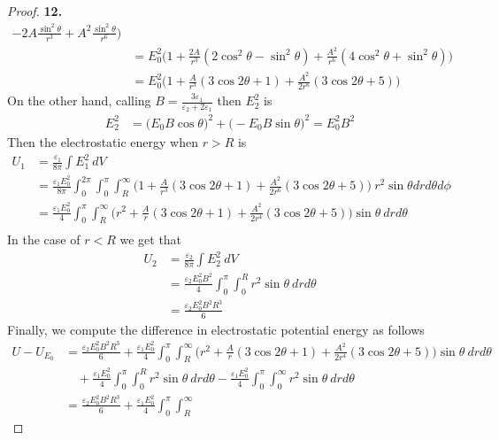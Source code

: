 \documentclass[11pt]{article}
\theoremstyle{definition}
\begin{document}
\begin{proof}{\textbf{12.}}
\begin{align*}
    - 2A\frac{\sin^2\theta}{r^3} + A^2\frac{\sin^2\theta}{r^6}\bigg)\\
    &= E_0^2\bigg(
        1 + \frac{2A}{r^3}(2\cos^2\theta - \sin^2\theta) + \frac{A^2}{r^6}(4\cos^2\theta +\sin^2\theta)
    \bigg)\\
    &= E_0^2\bigg(1 + \frac{A}{r^3}(3\cos2\theta + 1)
    + \frac{A^2}{2r^6}(3\cos2\theta + 5)\bigg)
\end{align*}
On the other hand, calling $B =\frac{3\varepsilon_1}{\varepsilon_2 + 2\varepsilon_1}$
then $E_2^2$ is
\begin{align*}
    E_2^2 &= \bigg(E_0B \cos\theta\bigg)^2 
    + \bigg(- E_0B \sin\theta\bigg)^2
    =E_0^2B^2
\end{align*}
Then the electrostatic energy when $r > R$ is
\begin{align*}
    U_1 &= \frac{\varepsilon_1}{8\pi}\int E_1^2~dV\\
    &= \frac{\varepsilon_1E_0^2}{8\pi}\int_0^{2\pi}\int_0^\pi\int_R^\infty
    \bigg(1 + \frac{A}{r^3}(3\cos2\theta + 1)
    + \frac{A^2}{2r^6}(3\cos2\theta + 5)\bigg)~r^2\sin\theta
    drd\theta d\phi\\
    &= \frac{\varepsilon_1E_0^2}{4}\int_0^\pi\int_R^\infty
    \bigg(r^2 + 
    \frac{A}{r}(3\cos2\theta + 1)
    + \frac{A^2}{2r^4}(3\cos2\theta + 5)
    \bigg)\sin\theta
    ~drd\theta\\
\end{align*}
In the case of $r < R$ we get that
\begin{align*}
    U_2 &= \frac{\varepsilon_2}{8\pi}\int E_2^2~dV\\
    &= \frac{\varepsilon_2E_0^2B^2}{4}\int_0^\pi\int_0^R 
    r^2\sin\theta~drd\theta\\
    &= \frac{\varepsilon_2E_0^2B^2R^3}{6}
\end{align*}
Finally, we compute the difference in electrostatic potential energy as follows
\begin{align*}
    U - U_{E_0} &= 
    \frac{\varepsilon_2E_0^2B^2R^3}{6} +
    \frac{\varepsilon_1E_0^2}{4}\int_0^\pi\int_R^\infty
    \bigg(r^2 + 
    \frac{A}{r}(3\cos2\theta + 1)
    + \frac{A^2}{2r^4}(3\cos2\theta + 5)
    \bigg)\sin\theta
    ~drd\theta\\
    &\quad
    + \frac{\varepsilon_1E_0^2}{4}\int_0^\pi\int_0^R r^2\sin\theta~drd\theta
    -\frac{\varepsilon_1E_0^2}{4}\int_0^\pi\int_0^\infty r^2\sin\theta~drd\theta\\
    &= \frac{\varepsilon_2E_0^2B^2R^3}{6} +
    \frac{\varepsilon_1E_0^2}{4}\int_0^\pi\int_R^\infty

\end{align*}
\end{proof}
\end{document}
